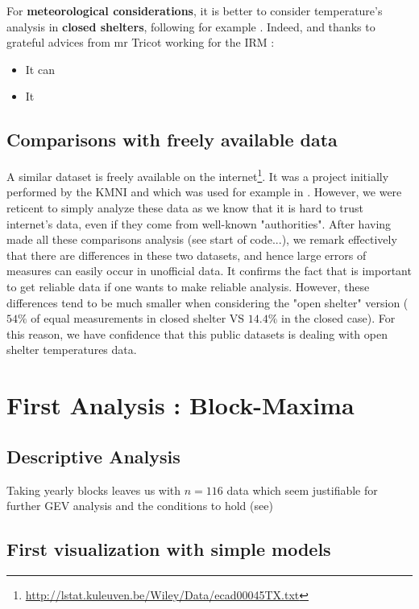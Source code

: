 \documentclass[11pt,a4paper,openany ]{book}
\begin{document}
For\textbf{ meteorological considerations}, it is better to consider temperature's analysis in \textbf{closed shelters}, following for example \citet{lindsey_use_1956}. Indeed, and thanks to grateful advices from mr Tricot working for the IRM : 
\begin{itemize}
	\item It can
	\item It
\end{itemize}


\subsection{Comparisons with freely available data} 

A similar dataset is freely available on the internet\footnote{\url{http://lstat.kuleuven.be/Wiley/Data/ecad00045TX.txt}}. It was a project initially performed by the KMNI and which was used for example in \citet{beirlant_statistics_2006}. However, we were reticent to simply analyze these data as we know that it is hard to trust internet's data, even if they come from well-known "authorities". After having made all these comparisons analysis (see start of code...), we remark effectively that there are differences
in these two datasets, and hence large errors of measures can easily occur 
in unofficial data. It confirms the fact that is important to get reliable data if one wants to make reliable analysis. 
However, these differences tend to be much smaller when considering the "open shelter"
version ($54\%$ of equal measurements in closed shelter VS $14.4\%$ in the closed case). For this reason, we have confidence that this public datasets
is dealing with open shelter temperatures data.






\section{First Analysis : Block-Maxima}


\subsection{Descriptive Analysis}

Taking yearly blocks leaves us with $n=116$ data which seem justifiable for further GEV analysis and the conditions to hold (see)


\subsection{First visualization with simple models}
\end{document}
